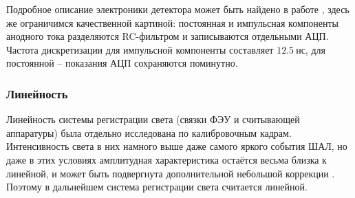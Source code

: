 Подробное описание электроники детектора может быть найдено в работе \cite{SphereDetector2020}, здесь же ограничимся качественной картиной: постоянная и импульсная компоненты анодного тока разделяются RC-фильтром и записываются отдельными АЦП. Частота дискретизации для импульсной компоненты составляет $12.5~\text{нс}$, для постоянной -- показания АЦП сохраняются поминутно.

\subsubsection{Линейность}

Линейность системы регистрации света (связки ФЭУ и считывающей аппаратуры) была отдельно исследована по калибровочным кадрам. Интенсивность света в них намного выше даже самого яркого события ШАЛ, но даже в этих условиях амплитудная характеристика остаётся весьма близка к линейной, и может быть подвергнута дополнительной небольшой коррекции \cite[рис. 6]{SphereCalibration2016}. Поэтому в дальнейшем система регистрации света считается линейной.
